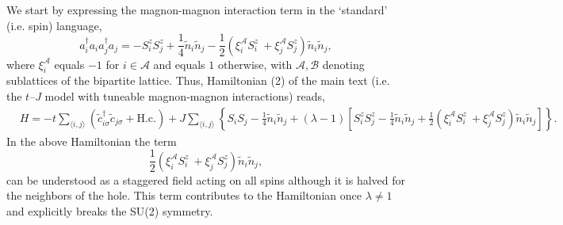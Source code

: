 \documentclass[%
 reprint,
 amsmath,amssymb,
 aps, onecolumn,
prl,
]{revtex4-1}
\newcommand{\mean}[1]{\langle#1\rangle}
\begin{document}
We start by expressing the magnon-magnon interaction term in the `standard' (i.e. spin) language,
\begin{equation}
    a_i^\dag a_i a_j^\dag a_j = -S_i^z S_j^z + \frac{1}{4}\tilde{n}_i\tilde{n}_j - \frac{1}{2}\left(\xi_i^\mathcal{A} S_i^z \ + \xi_j^\mathcal{A} S_j^z \right)\tilde{n}_i\tilde{n}_j,
\end{equation}
where $\xi_i^\mathcal{A}$ equals $-1$ for $i\in\mathcal{A}$ and equals $1$ otherwise, with $\mathcal{A},\mathcal{B}$ denoting sublattices of the bipartite lattice. Thus, Hamiltonian (2) of the main text (i.e. the $t$--$J$ model with tuneable magnon-magnon interactions) reads,
\begin{equation}
        \begin{aligned}
    	&H = -t\sum_{\mean{i,j}}\left(\tilde{c}_{i\sigma}^\dagger\tilde{c}_{j\sigma} + \text{H.c.}\right)
	+ J\sum_{\mean{i,j}}\left\{S_i S_j - \frac{1}{4}\tilde{n}_i\tilde{n}_j 
	+ \left(\lambda-1\right) \left[S_i^z S_j^z - \frac{1}{4}\tilde{n}_i\tilde{n}_j + \frac{1}{2}\left(\xi_i^\mathcal{A} S_i^z \ + \xi_j^\mathcal{A} S_j^z \right)\tilde{n}_i\tilde{n}_j\right] \right\}.
	\end{aligned}
	\label{eq:lambda_spin_model}
\end{equation}
In the above Hamiltonian the term
\begin{equation}
    \frac{1}{2}\left(\xi_i^\mathcal{A} S_i^z \ + \xi_j^\mathcal{A} S_j^z \right)\tilde{n}_i\tilde{n}_j,
    \label{eq:staggered_term}
\end{equation}
can be understood as a staggered field acting on all spins although it is halved for the neighbors of the hole. This term contributes to the Hamiltonian once $\lambda \neq 1$ and explicitly breaks the SU(2) symmetry.  
	


\end{document}
